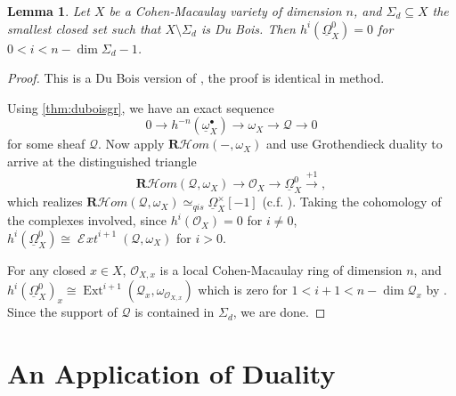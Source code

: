 \documentclass[proquest]{uwthesis}[2014/11/13]
\newtheorem{lemma}[theorem]{Lemma}
\theoremstyle{definition}
\DeclareMathOperator{\Ext}{Ext}
\DeclareMathOperator{\cExt}{\mathscr{E} \! \textit{xt}}
\newcommand{\cHom}{\mathcal{H} \textit{om}}
\newcommand{\OO}{\mathcal{O}}
\newcommand{\qis}{\simeq_{qis}}
\newcommand{\bR}{\textbf{R}}
\newcommand{\DB}{\underline{\Omega}}
\newcommand{\db}{\underline{\omega}^\bullet}
\begin{document}
\begin{lemma}
	Let $X$ be a Cohen-Macaulay variety of dimension $n$, and $\Sigma_d \subseteq X$ the smallest closed set such that $X \setminus \Sigma_d$ is Du Bois.
	Then $h^i (\DB_X^0) = 0$ for $0 < i < n - \dim \Sigma_d - 1$.
\end{lemma}
\begin{proof}
	This is a Du Bois version of \cite[Lemma~3.3]{Kovacs1999}, the proof is identical in method.
	
	Using \ref{thm:duboisgr}, we have an exact sequence
	\[
		0 \rightarrow h^{-n}(\db_X) \rightarrow \omega_X \rightarrow \mathscr{Q} \rightarrow 0
	\]
	for some sheaf $\mathscr{Q}$.
	Now apply $\bR \cHom (-, \omega_X)$ and use Grothendieck duality to arrive at the distinguished triangle
	\[
		\bR \cHom(\mathscr{Q}, \omega_X) \rightarrow \OO_X \rightarrow \DB_X^0 \xrightarrow{+1},
	\]
	which realizes $\bR \cHom(\mathscr{Q}, \omega_X) \qis \DB_X^\times[-1]$ (c.f. \cite[6.12]{Kollar2013}).
	Taking the cohomology of the complexes involved, since $h^i(\OO_X) = 0$ for $i \neq 0$, $h^i(\DB_X^0) \cong \cExt^{i+1}(\mathscr{Q}, \omega_X)$ for $i > 0$.
	
	For any closed $x \in X$, $\OO_{X,x}$ is a local Cohen-Macaulay ring of dimension $n$, and $h^i(\DB_X^0)_x \cong \Ext^{i+1}(\mathscr{Q}_x, \omega_{\OO_{X,x}})$ which is zero for $1 < i+1 < n - \dim \mathscr{Q}_x$ by \cite[3.5.11]{Bruns1993}. Since the support of $\mathscr{Q}$ is contained in $\Sigma_d$, we are done.
\end{proof}

\chapter{An Application of Duality}
\label{chp:applications}
\end{document}
